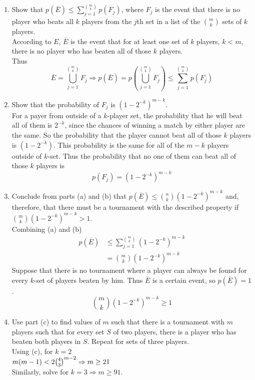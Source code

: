 \documentclass[a4paper]{article}
\begin{document}
	\begin{enumerate}[label=\alph*)]
	    \item Show that $p(\overline{E}) \leq \sum_{j=1}^{m \choose k} p(F_j)$, where $F_j$ is the event that there is no player who beats all $k$ players from the $j$th set in a list of the ${m \choose k}$ sets of $k$ players. \\
	    According to $E$, $\overline{E}$ is the event that for at least one set of $k$ players, $k<m$, there is no player who has beaten all of those $k$ players. \\
	    Thus
	    \begin{equation*}
	        \overline{E} = \bigcup_{j=1}^{m \choose k} F_j \Rightarrow p(\overline{E}) = p(\bigcup_{j=1}^{m \choose k} F_j) \leq \sum_{j=1}^{m \choose k} p(F_j)
	    \end{equation*}
	    \item Show that the probability of $F_j$ is $(1-2^{-k})^{m-k}$. \\
	    For a payer from outside of a $k$-player set, the probability that he will beat all of them is $2^{-k}$, since the chances of winning a match by either player are the same. So the probability that the player cannot beat all of those $k$ players is $(1-2^{-k})$. This probability is the same for all of the $m-k$ players outside of $k$-set. Thus the probability that no one of them can beat all of those $k$ players is
	    \begin{equation*}
	        p(F_j) = (1-2^{-k})^{m-k}
	    \end{equation*}
	    \item Conclude from parts (a) and (b) that $p(\overline{E})\leq {n \choose k}(1-2^{-k})^{m-k}$ and, therefore, that there must be a tournament with the described property if ${m\choose k}(1-2^{-k})^{m-k} >1$. \\
	    Combining (a) and (b)
	    \begin{align*}
	        p(\overline{E}) & \leq \sum_{j=1}^{m\choose k} (1-2^{-k})^{m-k} \\
	        & = {m \choose k}(1-2^{-k})^{m-k}
	    \end{align*}
        Suppose that there is no tournament where a player can always be found for every $k$-set of players beaten by him. Thus $\overline{E}$ is a certain event, so $p(\overline{E})=1$.
        \begin{equation*}
            {m \choose k}(1-2^{-k})^{m-k} \geq 1
        \end{equation*}
	    \item Use part (c) to find values of $m$ such that there is a tournament with $m$ players such that for every set $S$ of two players, there is a player who has beaten both players in $S$. Repeat for sets of three players. \\
	    Using (c), for $k=2$ \\
	    \begin{math}
	        m(m-1) < 2{4 \choose 3}^{m-2} \\
	        \Rightarrow m \geq 21
	    \end{math} \\
	    Similarly, solve for $k=3 \Rightarrow m \geq 91$.
	\end{enumerate}
	
\end{document}
